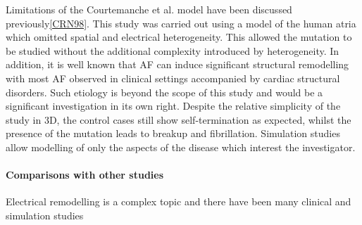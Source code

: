 Limitations of the Courtemanche et al. model have been discussed
previously\ref{CRN98}.
This study was carried out using a model of the human atria which omitted
spatial and electrical heterogeneity.
This allowed the mutation to be studied without the additional complexity
introduced by heterogeneity.
In addition, it is well known that AF can induce significant structural
remodelling with most AF observed in clinical settings accompanied by cardiac
structural disorders.
Such etiology is beyond the scope of this study and would be a significant
investigation in its own right.
Despite the relative simplicity of the study in 3D, the control cases still show
self-termination as expected, whilst the presence of the mutation leads to
breakup and fibrillation.
Simulation studies allow modelling of only the aspects of the disease which
interest the investigator.

\paragraph{Comparisons with other studies}

Electrical remodelling is a complex topic and there have been many clinical and
simulation studies 
